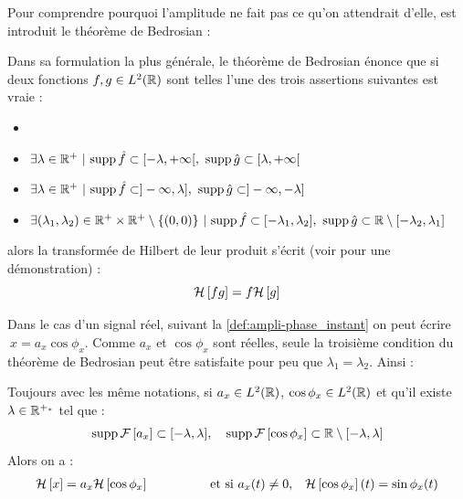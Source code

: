 Pour comprendre pourquoi l'amplitude ne fait pas ce qu'on attendrait d'elle, est introduit le théorème de Bedrosian :

\begin{theoreme}[de Bedrosian]\label{theo:2Bedrosian}
	Dans sa formulation la plus générale, le théorème de Bedrosian énonce que si deux fonctions $f,g\in L^2(\mathbb{R})$ sont telles l'une des trois assertions suivantes est vraie :
	\begin{itemize}%
		\item 
		\item $\exists \lambda\in\mathbb{R}^+\ |\ \text{\normalfont supp}\, \hat{f} \subset [-\lambda, +\infty[,\ \text{\normalfont supp}\, \hat{g} \subset [\lambda, +\infty[$\label{item:1condi_theo2Bedrosian}
		
		\item $\exists \lambda\in\mathbb{R}^+\ |\ \text{\normalfont supp}\, \hat{f} \subset ]-\infty, \lambda],\ \text{\normalfont supp}\, \hat{g} \subset ]-\infty,-\lambda]$ \label{item:2condi_theo2Bedrosian}
		
		\item $\exists (\lambda_1,\lambda_2)\in \mathbb{R}^+\times\mathbb{R}^+ \setminus\{(0,0)\}\ |\ \text{\normalfont supp}\, \hat{f} \subset [-\lambda_1, \lambda_2],\ \text{\normalfont supp}\, \hat{g} \subset \mathbb{R}\setminus[-\lambda_2,\lambda_1]$
		
	\end{itemize}
	alors la transformée de Hilbert de leur produit s'écrit (voir \cite{wang_simple_2009} pour une démonstration) :
	\begin{equation}\label{eq:2Bedrosian}
		\mathcal{H}\left[fg\right] = f\mathcal{H}\left[g\right]
	\end{equation}
\end{theoreme}

Dans le cas d'un signal réel, suivant la \cref{def:ampli-phase_instant} on peut écrire $\ x=a_x\cos \phi_x$.
Comme $a_x$ et $\cos \phi_x$ sont réelles, seule la troisième condition du théorème de Bedrosian peut être satisfaite pour peu que $\lambda_1=\lambda_2$. Ainsi :

\begin{corollaire}\label{coro:AM-FM}
	Toujours avec les même notations, si $a_x\in L^2(\mathbb{R})$, $\cos\phi_x\in L^2(\mathbb{R})$ et qu'il existe $\lambda\in\mathbb{R}^{+_*}$ tel que :
	\begin{equation}\label{eq:condi_AM-FM}
		\text{\normalfont supp}\, \mathcal{F}\left[a_x\right] \subset [-\lambda, \lambda],\quad \text{\normalfont supp}\, \mathcal{F}\left[\cos\phi_x\right] \subset \mathbb{R}\setminus[-\lambda,\lambda]
	\end{equation}
	Alors on a :
	\begin{align}\label{eq:result_AM-FM}
		\mathcal{H}\left[x\right] &= a_x\mathcal{H}\left[\cos \phi_x\right]  &  \qquad\qquad&\text{et si }a_x(t)\neq 0,  &  \mathcal{H}\left[\cos \phi_x\right](t) = \sin\phi_x(t)
	\end{align}
\end{corollaire}
\skipl


